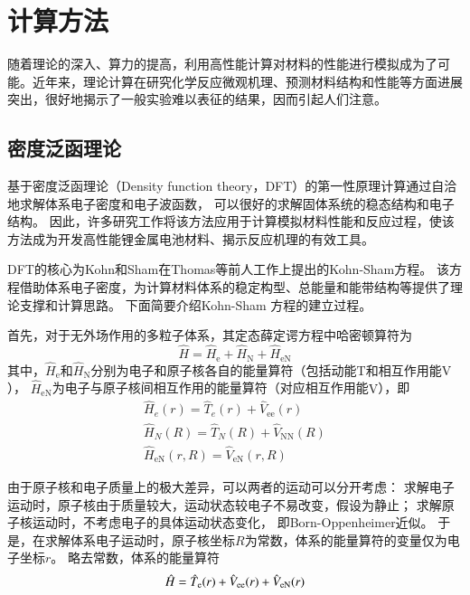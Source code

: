 \section{计算方法}

随着理论的深入、算力的提高，利用高性能计算对材料的性能进行模拟成为了可能。近年来，理论计算在研究化学反应微观机理、预测材料结构和性能等方面进展突出，很好地揭示了一般实验难以表征的结果，因而引起人们注意。

\subsection{密度泛函理论}

基于密度泛函理论（Density function theory，DFT）的第一性原理计算通过自洽地求解体系电子密度和电子波函数，
可以很好的求解固体系统的稳态结构和电子结构。
因此，许多研究工作将该方法应用于计算模拟材料性能和反应过程，使该方法成为开发高性能锂金属电池材料、揭示反应机理的有效工具。

DFT的核心为Kohn和Sham在Thomas等前人工作上提出的Kohn-Sham方程。
该方程借助体系电子密度，为计算材料体系的稳定构型、总能量和能带结构等提供了理论支撑和计算思路。
下面简要介绍Kohn-Sham 方程的建立过程。

首先，对于无外场作用的多粒子体系，其定态薛定谔方程中哈密顿算符为
\begin{equation}
    \hat{H}=\hat{H}_{\mathrm{e}}+\hat{H}_{\mathrm{N}}+\hat{H}_{\mathrm{eN}}
\end{equation}
其中，$\hat{H}_{\mathrm{e}}$和$\hat{H}_{\mathrm{N}}$分别为电子和原子核各自的能量算符（包括动能$\mathrm{T}$和相互作用能$\mathrm{V}$），
$\hat{H}_{\mathrm{eN}}$为电子与原子核间相互作用的能量算符（对应相互作用能$\mathrm{V}$），即
\begin{gather}
    \hat{H}_e(r) = \hat{T}_e(r)+\hat{V}_{\mathrm{ee}}(r) \\
    \hat{H}_N(R) = \hat{T}_N(R)+\hat{V}_{\mathrm{NN}}(R) \\ 
    \hat{H}_{\mathrm{eN}}(r,R) = \hat{V}_{\mathrm{eN}}(r,R) 
\end{gather}

由于原子核和电子质量上的极大差异，可以两者的运动可以分开考虑：
求解电子运动时，原子核由于质量较大，运动状态较电子不易改变，假设为静止；
求解原子核运动时，不考虑电子的具体运动状态变化，
即Born-Oppenheimer近似。
于是，在求解体系电子运动时，原子核坐标$R$为常数，体系的能量算符的变量仅为电子坐标$r$。
略去常数，体系的能量算符
\begin{equation}{\label{eq:total}}
    \hat{H}=\hat{T}_{\mathrm{e}}(r)+\hat{V}_{\mathrm{ee}}(r)+\hat{V}_{\mathrm{eN}}(r)
\end{equation}

